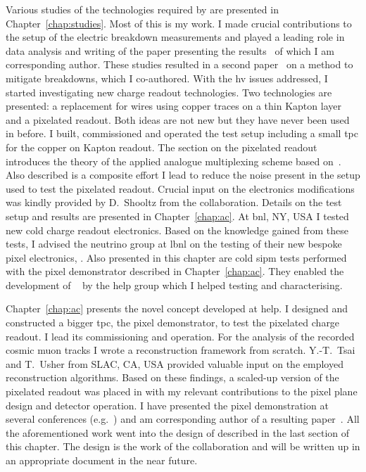 Various studies of the technologies required by \AC{} are presented in Chapter~\ref{chap:studies}.
Most of this is my work.
I made crucial contributions to the setup of the electric breakdown measurements and played a leading role in data analysis and writing of the paper presenting the results~\cite{breakdown_16} of which I am corresponding author.
These studies resulted in a second paper~\cite{latex} on a method to mitigate breakdowns, which I co-authored.
With the \gls{hv} issues addressed, I started investigating new charge readout technologies.
Two technologies are presented: a replacement for wires using copper traces on a thin Kapton layer and a pixelated readout.
Both ideas are not new but they have never been used in \lar{} before.
I built, commissioned and operated the test setup including a small \gls{tpc} for the copper on Kapton readout.
The section on the pixelated readout introduces the theory of the applied analogue multiplexing scheme based on~\cite{maplesyrup}.
Also described is a composite effort I lead to reduce the noise present in the setup used to test the pixelated readout.
Crucial input on the electronics modifications was kindly provided by D.\ Shooltz from the \lariat{} collaboration.
Details on the test setup and results are presented in Chapter~\ref{chap:ac}.
At \gls{bnl}, NY, USA I tested new cold charge readout electronics.
Based on the knowledge gained from these tests, I advised the neutrino group at \gls{lbnl} on the testing of their new bespoke pixel electronics, \larpix{}.
Also presented in this chapter are cold \gls{sipm} tests performed with the pixel demonstrator described in Chapter~\ref{chap:ac}.
They enabled the development of \AL{}~\cite{arclight} by the \gls{help} \lar{} group which I helped testing and characterising.

Chapter~\ref{chap:ac} presents the novel \AC{} \lartpc{} concept developed at \gls{help}.
I designed and constructed a bigger \gls{tpc}, the pixel demonstrator, to test the pixelated charge readout.
I lead its commissioning and operation.
For the analysis of the recorded cosmic muon tracks I wrote a reconstruction framework from scratch.
Y.-T.\ Tsai and T.\ Usher from SLAC, CA, USA provided valuable input on the employed reconstruction algorithms.
Based on these findings, a scaled-up version of the pixelated readout was placed in \lariat{} with my relevant contributions to the pixel plane design and detector operation.
I have presented the pixel demonstration at several conferences (e.g.~\cite{pixel_proceedings}) and am corresponding author of a resulting paper~\cite{pixel_paper}.
All the aforementioned work went into the design of \AC{} described in the last section of this chapter.
The design is the work of the \AC{} collaboration and will be written up in an appropriate document in the near future.

